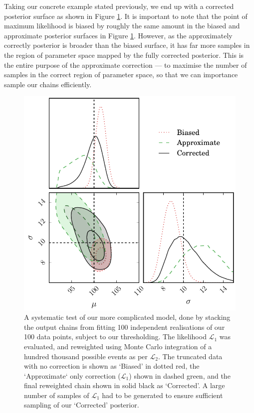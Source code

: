 \documentclass[a4paper,fleqn,usenatbib]{mnras}
\begin{document}
Taking our concrete example stated previously, we end up with a corrected posterior surface as shown in Figure \ref{fig:real}. It is important to note that the point of maximum likelihood is biased by roughly the same amount in the biased and approximate posterior surfaces in Figure \ref{fig:real}. However, as the approximately correctly posterior is broader than the biased surface, it has far more samples in the region of parameter space mapped by the fully corrected posterior. This is the entire purpose of the approximate correction --- to maximise the number of samples in the correct region of parameter space, so that we can importance sample our chains efficiently.
\begin{figure}
	\begin{center}
		\includegraphics[width=\columnwidth]{example/real.pdf}
	\end{center}
	\caption{A systematic test of our more complicated model, done by stacking the output chains from fitting 100 independent realisations of our 100 data points, subject to our thresholding. The likelihood $\mathcal{L}_1$ was evaluated, and reweighted using Monte Carlo integration of a hundred thousand possible events as per $\mathcal{L}_2$. The truncated data with no correction is shown as `Biased' in dotted red, the `Approximate` only correction ($\mathcal{L}_1$) shown in dashed green, and the final reweighted chain shown in solid black as `Corrected'. A large number of samples of $\mathcal{L}_1$ had to be generated to ensure sufficient sampling of our `Corrected' posterior.}
	\label{fig:real}
\end{figure}
\end{document}
